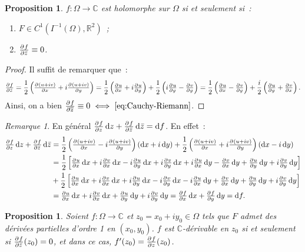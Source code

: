 \documentclass{report}
\newtheorem{prp}[thm]{Proposition}
\theoremstyle{definition}
\theoremstyle{remark}
\newtheorem*{rmq}{Remarque}
\numberwithin{equation}{section}
\newcommand{\C}{\mathbb C}
\newcommand{\R}{\mathbb R}
\begin{document}
			\begin{prp} $f : \Omega \to \C$ est holomorphe sur $\Omega$ si et seulement si~:
			\begin{enumerate}
				\item $F \in C^1\left(I^{-1}(\Omega), \R^2\right)$~;
				\item $\pd f{\bar z} \equiv 0$.
			\end{enumerate}
			\end{prp}

			\begin{proof}
			Il suffit de remarquer que~:
			\begin{equation}
				\pd f{\bar z} = \frac 12\left(\pd {(u+iv)}x + i\pd {(u+iv)}y\right) = \frac 12\left(\pd ux +i\pd uy\right) + \frac 12\left(i\pd uy - \pd vy\right)
					= \frac 12\left(\pd ux - \pd vy\right) + \frac i2\left(\pd uy + \pd vx\right).
			\end{equation}
			Ainsi, on a bien $\pd f{\overline z} \equiv 0 \iff \eqref{eq:Cauchy-Riemann}$.
			\end{proof}

			\begin{rmq} En général $\pd fz\dif z + \pd f{\bar z}\dif \bar z = \dif f$.  %
			En effet~:
			\begin{align}\displaystyle
				\pd fz\dif z + \pd f{\bar z}\dif \bar z &= \frac 12\left(\pd {(u+iv)}x - i\pd {(u+iv)}y\right)\left(\dif x + i\dif y\right) + \frac 12\left(\pd {(u+iv)}x + i\pd {(u+iv)}y\right)\left(\dif x - i\dif y\right) \\
				&= \frac 12\left[\pd ux\dif x + i\pd vx\dif x - i\pd uy\dif x + i\pd vy\dif x + i\pd ux\dif y - \pd vx\dif y + \pd uy\dif y + i\pd vy\dif y\right] \\
				&+ \frac 12\left[\pd ux\dif x + i\pd vx\dif x + i\pd uy\dif x - i\pd vy\dif x - i\pd ux\dif y + \pd vx\dif y + \pd uy\dif y + i\pd vy\dif y\right] \\
				&= \pd ux\dif x + i\pd vx\dif x + \pd uy\dif y + i\pd vy\dif y = \pd fx\dif x + \pd fy\dif y = \dif f.
			\end{align}
			\end{rmq}

			\begin{prp} Soient $f : \Omega \to \C$ et $z_0 = x_0 + iy_0 \in \Omega$ tels que $F$ admet des dérivées partielles d'ordre 1 en $(x_0, y_0)$. $f$
			est $\C$-dérivable en $z_0$ si et seulement si $\pd f{\bar z}(z_0) = 0$, et dans ce cas, $f'(z_0) = \pd fz(z_0)$.
			\end{prp}
\end{document}
